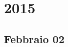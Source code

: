 \documentclass[12pt,a4paper]{report}
\begin{document}
 

\maketitle
\tableofcontents
 
\chapter{2015}
\section{Febbraio 02}
%
%

%
%
%
%
%

 
\end{document}
